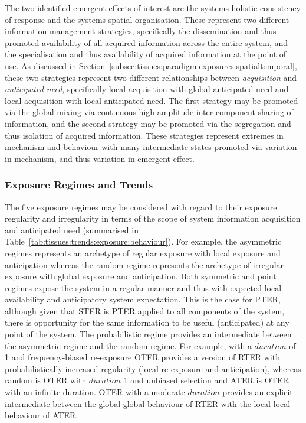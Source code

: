 The two identified emergent effects of interest are the systems holistic consistency of response and the systems spatial organisation. These represent two different information management strategies, specifically the dissemination and thus promoted availability of all acquired information across the entire system, and the specialisation and thus availability of acquired information at the point of use. As discussed in Section~\ref{subsec:tissues:paradigm:exposures:spatialtemporal}, these two strategies represent two different relationships between \emph{acquisition} and \emph{anticipated need}, specifically local acquisition with global anticipated need and local acquisition with local anticipated need. The first strategy may be promoted via the global mixing via continuous high-amplitude inter-component sharing of information, and the second strategy may be promoted via the segregation and thus isolation of acquired information. These strategies represent extremes in mechanism and behaviour with many intermediate states promoted via variation in mechanism, and thus variation in emergent effect.

%
%
\subsubsection{Exposure Regimes and Trends}
The five exposure regimes may be considered with regard to their exposure regularity and irregularity in terms of the scope of system information acquisition and anticipated need (summarised in Table~\ref{tab:tissues:trends:exposure:behaviour}). 
For example, the asymmetric regimes represents an archetype of regular exposure with local exposure and anticipation whereas the random regime represents the archetype of irregular exposure with global exposure and anticipation. 
Both symmetric and point regimes expose the system in a regular manner and thus with expected local availability and anticipatory system expectation. This is the case for PTER, although given that STER is PTER applied to all components of the system, there is opportunity for the same information to be useful (anticipated) at any point of the system.
The probabilistic regime provides an intermediate between the asymmetric regime and the random regime. For example, with a $duration$ of 1 and frequency-biased re-exposure OTER provides a version of RTER with probabilistically increased regularity (local re-exposure and anticipation), whereas random is OTER with $duration$ 1 and unbiased selection and ATER is OTER with an infinite duration. OTER with a moderate $duration$ provides an explicit intermediate between the global-global behaviour of RTER with the local-local behaviour of ATER.


